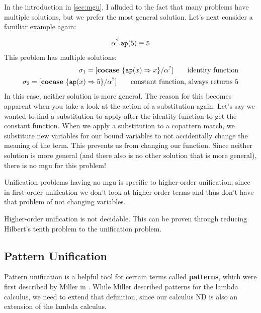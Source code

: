 \documentclass[twoside,12pt,a4paper]{article}
\begin{document}
In the introduction in \cref{sec:mgu}, I alluded to the fact that many problems have multiple solutions, but we prefer the most general solution.
Let's next consider a familiar example again:
\begin{example}\label{no most general}
    \begin{align*}
        \alpha^?.\texttt{ap}(5) \equiv \texttt{5}
    \end{align*}
    This problem has multiple solutions:
    \begin{align*}
        \sigma_1 = [\textbf{cocase}\ \{\texttt{ap}(x)\Rightarrow x\} / \alpha^?]\tag*{identity function}\\
        \sigma_2 = [\textbf{cocase}\ \{\texttt{ap}(x)\Rightarrow 5\} / \alpha^?]\tag*{constant function, always returns 5}
    \end{align*}
    In this case, neither solution is more general. The reason for this becomes apparent when you take a look at the action of a substitution again. 
Let's say we wanted to find a substitution to apply after the identity function to get the constant function. 
When we apply a substitution to a copattern match, we substitute new variables for our bound variables to not accidentally change the meaning of the term.
This prevents us from changing our function. 
Since neither solution is more general (and there also is no other solution that is more general),
there is no mgu for this problem!
\end{example}

Unification problems having no mgu is specific to higher-order unification, since in first-order unification we don't look at 
higher-order terms and thus don't have that problem of not changing variables.

\begin{theorem}
    Higher-order unification is not decidable. This can be proven through reducing Hilbert's tenth problem to the unification problem. \cite{GOLDFARB1981225}
\end{theorem}

\subsection{Pattern Unification}

Pattern unification is a helpful tool for certain terms called \textbf{patterns}, which were first described by Miller in \cite{10.1093/logcom/1.4.497}.
While Miller described patterns for the lambda calculus, we need to extend that definition, since our calculus ND is also an extension of the lambda calculus. 
\end{document}
